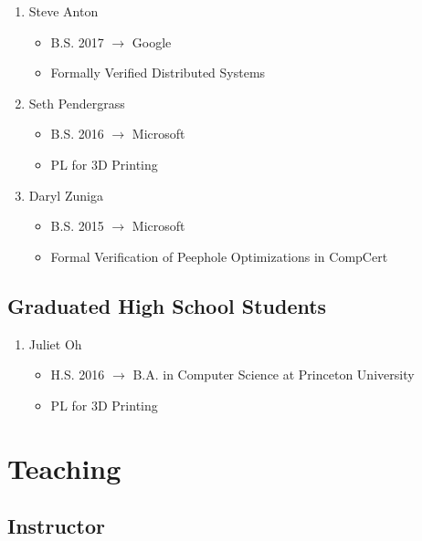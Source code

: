 \documentclass[10pt]{article}
\begin{document}
\begin{enumerate}[resume]
  \item Steve Anton
    \begin{itemize}
      \item B.S. 2017 $\rightarrow$ Google
      \item Formally Verified Distributed Systems
    \end{itemize}

  \item Seth Pendergrass
    \begin{itemize}
      \item B.S. 2016 $\rightarrow$ Microsoft
      \item PL for 3D Printing
    \end{itemize}

  \item Daryl Zuniga
    \begin{itemize}
      \item B.S. 2015 $\rightarrow$ Microsoft
      \item Formal Verification of Peephole Optimizations in CompCert
    \end{itemize}
\end{enumerate}

\subsection*{Graduated High School Students}

\begin{enumerate}[resume]
  \item Juliet Oh
    \begin{itemize}
      \item H.S. 2016 $\rightarrow$ B.A. in Computer Science at Princeton University
      \item PL for 3D Printing
    \end{itemize}
\end{enumerate}


\section*{Teaching}

\subsection*{Instructor}
\end{document}
